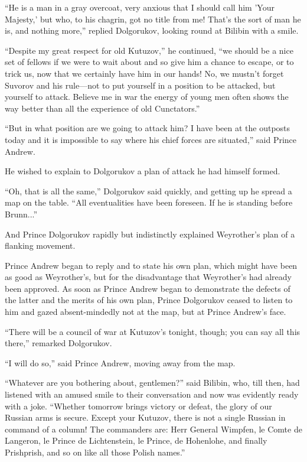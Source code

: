 ``He is a man in a gray overcoat, very anxious that I should call
him 'Your Majesty,' but who, to his chagrin, got no title from
me! That's the sort of man he is, and nothing more,'' replied
Dolgorukov, looking round at Bilibin with a smile.

``Despite my great respect for old Kutuzov,'' he continued, ``we
should be a nice set of fellows if we were to wait about and so
give him a chance to escape, or to trick us, now that we
certainly have him in our hands!  No, we mustn't forget Suvorov
and his rule---not to put yourself in a position to be attacked,
but yourself to attack. Believe me in war the energy of young men
often shows the way better than all the experience of old
Cunctators.''

``But in what position are we going to attack him? I have been at
the outposts today and it is impossible to say where his chief
forces are situated,'' said Prince Andrew.

He wished to explain to Dolgorukov a plan of attack he had
himself formed.

``Oh, that is all the same,'' Dolgorukov said quickly, and
getting up he spread a map on the table. ``All eventualities have
been foreseen. If he is standing before Brunn...''

And Prince Dolgorukov rapidly but indistinctly explained
Weyrother's plan of a flanking movement.

Prince Andrew began to reply and to state his own plan, which
might have been as good as Weyrother's, but for the disadvantage
that Weyrother's had already been approved. As soon as Prince
Andrew began to demonstrate the defects of the latter and the
merits of his own plan, Prince Dolgorukov ceased to listen to him
and gazed absent-mindedly not at the map, but at Prince Andrew's
face.

``There will be a council of war at Kutuzov's tonight, though;
you can say all this there,'' remarked Dolgorukov.

``I will do so,'' said Prince Andrew, moving away from the map.

``Whatever are you bothering about, gentlemen?'' said Bilibin,
who, till then, had listened with an amused smile to their
conversation and now was evidently ready with a joke. ``Whether
tomorrow brings victory or defeat, the glory of our Russian arms
is secure. Except your Kutuzov, there is not a single Russian in
command of a column! The commanders are: Herr General Wimpfen, le
Comte de Langeron, le Prince de Lichtenstein, le Prince, de
Hohenlohe, and finally Prishprish, and so on like all those
Polish names.''

